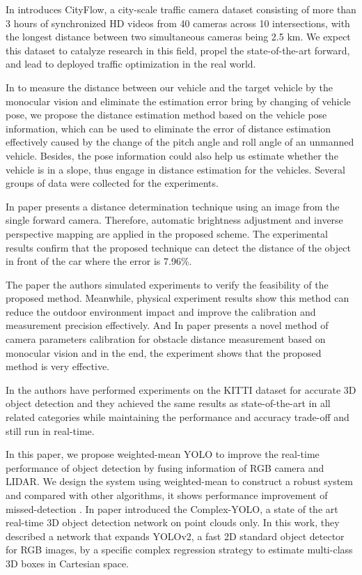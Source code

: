 In \cite{Tang2019} introduces CityFlow, a city-scale traffic camera dataset consisting of more than 3 hours of synchronized HD videos from 40 cameras across 10 intersections, with the longest distance between two simultaneous cameras being 2.5 km. We expect this dataset to catalyze research in this field, propel the state-of-the-art forward, and lead to deployed traffic optimization in the real world.

In \cite{Qi2019} to measure the distance between our vehicle and the target vehicle by the monocular vision and eliminate the estimation error bring by changing of vehicle pose, we propose the distance estimation method based on the vehicle pose information, which can be used to eliminate the error of distance estimation effectively caused by the change of the pitch angle and roll angle of an unmanned vehicle. Besides, the pose information could also help us estimate whether the vehicle is in a slope, thus engage in distance estimation for the vehicles. Several groups of data were collected for the experiments.

In paper \cite{Wongsaree2018} presents a distance determination technique using an image from the single forward camera. Therefore, automatic brightness adjustment and inverse perspective mapping are applied in the proposed scheme. The experimental results confirm that the proposed technique can detect the distance of the object in front of the car where the error is 7.96\%.

The paper \cite{Pan2019} the authors simulated experiments to verify the feasibility of the proposed method. Meanwhile, physical experiment results show this method can reduce the outdoor environment impact and improve the calibration and measurement precision effectively. And In paper \cite{Lin2014} presents a novel method of camera parameters calibration for obstacle distance measurement based on monocular vision and in the end, the experiment shows that the proposed method is very effective.

In \cite{Simon2019a} the authors have performed experiments on the KITTI dataset for accurate 3D object detection and they achieved the same results as state-of-the-art in all related categories while maintaining the performance and accuracy trade-off and still run in real-time.


In this paper, we propose weighted-mean YOLO to improve the real-time performance of object detection by fusing information of RGB camera and LIDAR. We design the system using weighted-mean to construct a robust system and compared with other algorithms, it shows performance improvement of missed-detection \cite{Kim2019}. In paper \cite{Simon2019} introduced the Complex-YOLO, a state of the art real-time 3D object detection network on point clouds only. In this work, they described a network that expands YOLOv2, a fast 2D standard object detector for RGB images, by a specific complex regression strategy to estimate multi-class 3D boxes in Cartesian space. 


